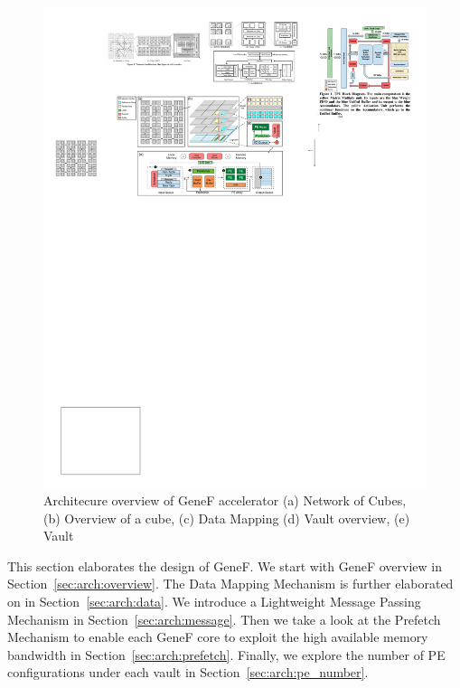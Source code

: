 \documentclass[9pt,conference]{IEEEtran}
\begin{document}
\begin{figure}[t]
\centering
\includegraphics[width=\linewidth]{fig/hpca20-v4.pdf}
\caption{Architecure overview of GeneF accelerator (a) Network of Cubes, (b) Overview of a cube, (c) Data Mapping (d) Vault overview, (e) Vault}
\label{fig:arch_design}
\end{figure}

This section elaborates the design of GeneF. We start with GeneF overview in Section~\ref{sec:arch:overview}.
The Data Mapping Mechanism is further elaborated on in Section~\ref{sec:arch:data}. We introduce a Lightweight Message Passing Mechanism in Section~\ref{sec:arch:message}. Then we take a look at the Prefetch Mechanism to enable each GeneF core to exploit the high available memory bandwidth in Section~\ref{sec:arch:prefetch}. Finally, we explore the number of PE configurations under each vault in Section~\ref{sec:arch:pe_number}.
\end{document}

